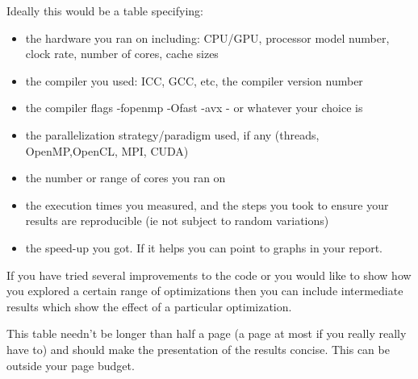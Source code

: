 \documentclass[11pt, oneside, a4paper]{article}
\begin{document}
Ideally this would be a table specifying:
\begin{itemize}
\item  the hardware you ran on including: CPU/GPU, processor model number, clock rate, number of cores, cache sizes
\item  the compiler you used: ICC, GCC, etc, the compiler version number
\item  the compiler flags -fopenmp -Ofast -avx  - or whatever your choice is
\item  the parallelization strategy/paradigm used, if any (threads, OpenMP,OpenCL, MPI, CUDA)
\item  the number or range of cores you ran on
\item  the execution times you measured, and the steps you took to ensure your results are reproducible (ie not subject to random variations)
\item  the speed-up you got. If it helps you can point to graphs in your report.
\end{itemize}
If you have tried several improvements to the code or you would like to show how you explored a certain range of optimizations then you can include intermediate results which show the effect of a particular optimization.

This table needn't be longer than half a page (a page at most if you really really have to) and should make the presentation of the results concise.  This can be outside your page budget.


\clearpage



\end{document}
